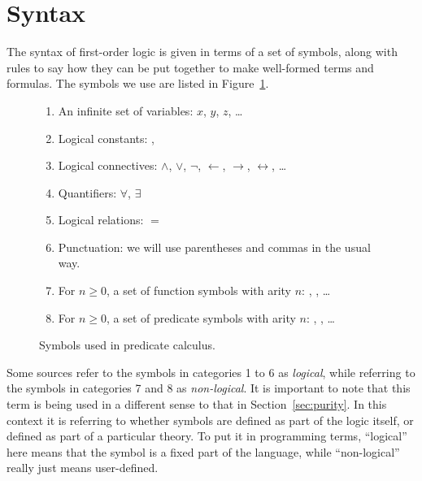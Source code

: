 \section{Syntax}
\label{sec:syntax}

The syntax of first-order logic is given in terms of a set of symbols,
along with rules to say how they can be put together
to make well-formed terms and formulas.
The symbols we use are listed in Figure~\ref{fig:symbols}.

\begin{figure}
\begin{enumerate}
\item
An infinite set of variables:
$x$, $y$, $z$, \ldots{}
\item
Logical constants:
\true, \false
\item
Logical connectives:
$\land$, $\lor$, $\lnot$, $\leftarrow$, $\rightarrow$,
$\leftrightarrow$, \ldots
\item
Quantifiers:
$\forall$, $\exists$
\item
Logical relations: $=$
\item
Punctuation: we will use parentheses and commas in the usual way.
\item
For $n \geqslant 0$,
a set of function symbols with arity $n$:
, , \ldots
\item
For $n \geqslant 0$,
a set of predicate symbols with arity $n$:
, , \ldots
\end{enumerate}
\caption{Symbols used in predicate calculus.\label{fig:symbols}}
\end{figure}

Some sources refer to the symbols in categories 1 to 6
as \emph{logical},
while referring to the symbols in categories 7 and 8 as
\emph{non-logical\label{gi:non-logical2}}.
It is important to note that
this term is being used in a different sense
to that in Section~\ref{sec:purity}.
In this context it is referring to whether symbols are
defined as part of the logic itself,
or defined as part of a particular theory.
To put it in programming terms,
``logical'' here means that
the symbol is a fixed part of the language,
while ``non-logical'' really just means user-defined.

